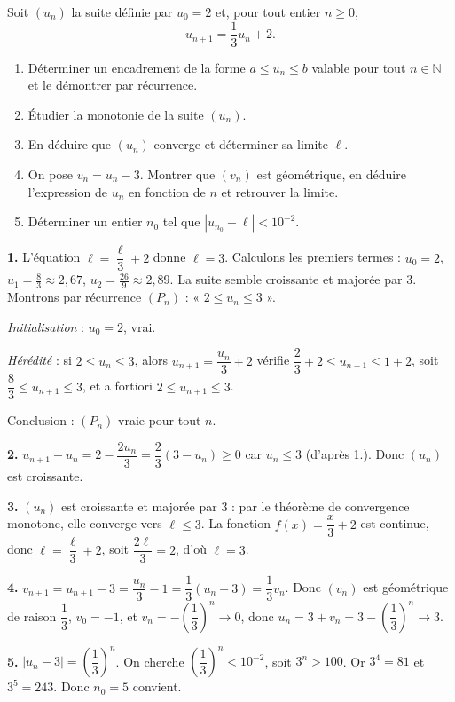\documentclass[11pt]{article}
\begin{document}
\begin{exercice}
Soit $(u_n)$ la suite définie par $u_0 = 2$ et, pour tout entier $n \ge 0$,
\[ u_{n+1} = \frac{1}{3}u_n + 2. \]
\begin{enumerate}
\item Déterminer un encadrement de la forme $a \le u_n \le b$ valable pour tout $n \in \mathbb{N}$ et le démontrer par récurrence.
\item Étudier la monotonie de la suite $(u_n)$.
\item En déduire que $(u_n)$ converge et déterminer sa limite $\ell$.
\item On pose $v_n = u_n - 3$. Montrer que $(v_n)$ est géométrique, en déduire l'expression de $u_n$ en fonction de $n$ et retrouver la limite.
\item Déterminer un entier $n_0$ tel que $|u_{n_0} - \ell| < 10^{-2}$.
\end{enumerate}
\end{exercice}

\begin{corrige}[Exercice]
\textbf{1.} L'équation $\ell = \dfrac{\ell}{3} + 2$ donne $\ell = 3$. Calculons les premiers termes : $u_0=2$, $u_1=\frac{8}{3}\approx 2,67$, $u_2=\frac{26}{9}\approx 2,89$. La suite semble croissante et majorée par $3$. Montrons par récurrence $(P_n)$ : « $2 \le u_n \le 3$ ». 

\emph{Initialisation} : $u_0 = 2$, vrai. 

\emph{Hérédité} : si $2 \le u_n \le 3$, alors $u_{n+1} = \dfrac{u_n}{3} + 2$ vérifie $\dfrac{2}{3} + 2 \le u_{n+1} \le 1 + 2$, soit $\dfrac{8}{3} \le u_{n+1} \le 3$, et a fortiori $2 \le u_{n+1} \le 3$. 

Conclusion : $(P_n)$ vraie pour tout $n$.

\textbf{2.} $u_{n+1} - u_n = 2 - \dfrac{2u_n}{3} = \dfrac{2}{3}(3 - u_n) \ge 0$ car $u_n \le 3$ (d'après 1.). Donc $(u_n)$ est croissante.

\textbf{3.} $(u_n)$ est croissante et majorée par $3$ : par le théorème de convergence monotone, elle converge vers $\ell \le 3$. La fonction $f(x) = \dfrac{x}{3} + 2$ est continue, donc $\ell = \dfrac{\ell}{3} + 2$, soit $\dfrac{2\ell}{3} = 2$, d'où $\ell = 3$.

\textbf{4.} $v_{n+1} = u_{n+1} - 3 = \dfrac{u_n}{3} - 1 = \dfrac{1}{3}(u_n - 3) = \dfrac{1}{3}v_n$. Donc $(v_n)$ est géométrique de raison $\dfrac{1}{3}$, $v_0 = -1$, et $v_n = -\left(\dfrac{1}{3}\right)^n \to 0$, donc $u_n = 3 + v_n = 3 - \left(\dfrac{1}{3}\right)^n \to 3$.

\textbf{5.} $|u_n - 3| = \left(\dfrac{1}{3}\right)^n$. On cherche $\left(\dfrac{1}{3}\right)^n < 10^{-2}$, soit $3^n > 100$. Or $3^4 = 81$ et $3^5 = 243$. Donc $n_0 = 5$ convient.
\end{corrige}
\end{document}
